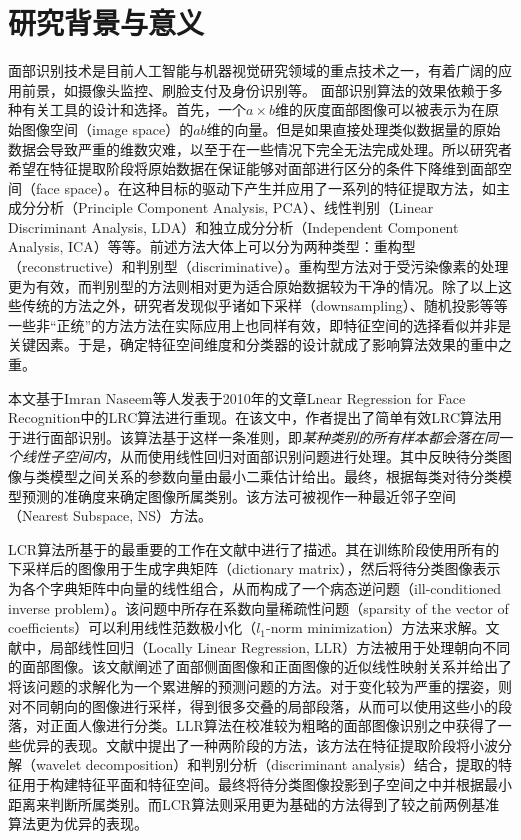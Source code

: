 \documentclass[UTF8]{ctexart}
\begin{document}
\section{研究背景与意义}\label{sec-1}
面部识别技术是目前人工智能与机器视觉研究领域的重点技术之一，有着广阔的应用前景，如摄像头监控、刷脸支付及身份识别等。
面部识别算法的效果依赖于多种有关工具的设计和选择。首先，一个\(a \times b\)维的灰度面部图像可以被表示为在原始图像空间（image space）的\(ab\)维的向量。但是如果直接处理类似数据量的原始数据会导致严重的维数灾难，以至于在一些情况下完全无法完成处理。所以研究者希望在特征提取阶段将原始数据在保证能够对面部进行区分的条件下降维到面部空间（face space）。在这种目标的驱动下产生并应用了一系列的特征提取方法，如主成分分析（Principle Component Analysis, PCA）\cite{b1}、线性判别（Linear Discriminant Analysis, LDA）\cite{598228}和独立成分分析（Independent Component Analysis, ICA）\cite{comon1994independent,bartlett2001independent}等等。前述方法大体上可以分为两种类型：重构型（reconstructive）和判别型（discriminative）。重构型方法对于受污染像素的处理更为有效，而判别型的方法则相对更为适合原始数据较为干净的情况\cite{duda2012pattern}。除了以上这些传统的方法之外，研究者发现似乎诸如下采样（downsampling）、随机投影等等一些非“正统”的方法方法在实际应用上也同样有效，即特征空间的选择看似并非是关键因素\cite{4483511}。于是，确定特征空间维度和分类器的设计就成了影响算法效果的重中之重。\par
本文基于Imran Naseem等人发表于2010年的文章Lnear Regression for Face Recognition\cite{5506092}中的LRC算法进行重现。在该文中，作者提出了简单有效LRC算法用于进行面部识别。该算法基于这样一条准则，即\textit{某种类别的所有样本都会落在同一个线性子空间内}\cite{598228,1177153}，从而使用线性回归对面部识别问题进行处理。其中反映待分类图像与类模型之间关系的参数向量由最小二乘估计给出。最终，根据每类对待分类模型预测的准确度来确定图像所属类别。该方法可被视作一种最近邻子空间（Nearest Subspace, NS）方法。\par
LCR算法所基于的最重要的工作在文献\cite{4483511}中进行了描述。其在训练阶段使用所有的下采样后的图像用于生成字典矩阵（dictionary matrix），然后将待分类图像表示为各个字典矩阵中向量的线性组合，从而构成了一个病态逆问题（ill-conditioned inverse problem）。该问题中所存在系数向量稀疏性问题（sparsity of the vector of coefficients）可以利用线性范数极小化（\(l_1\)-norm minimization）方法来求解。文献\cite{1114855}中，局部线性回归（Locally Linear Regression, LLR）方法被用于处理朝向不同的面部图像。该文献阐述了面部侧面图像和正面图像的近似线性映射关系并给出了将该问题的求解化为一个累进解的预测问题的方法。对于变化较为严重的摆姿，则对不同朝向的图像进行采样，得到很多交叠的局部段落，从而可以使用这些小的段落，对正面人像进行分类。LLR算法在校准较为粗略的面部图像识别之中获得了一些优异的表现。文献\cite{1114855}中提出了一种两阶段的方法，该方法在特征提取阶段将小波分解（wavelet decomposition）和判别分析（discriminant analysis）结合，提取的特征用于构建特征平面和特征空间。最终将待分类图像投影到子空间之中并根据最小距离来判断所属类别。而LCR算法则采用更为基础的方法得到了较之前两例基准算法更为优异的表现。\par
\end{document}
